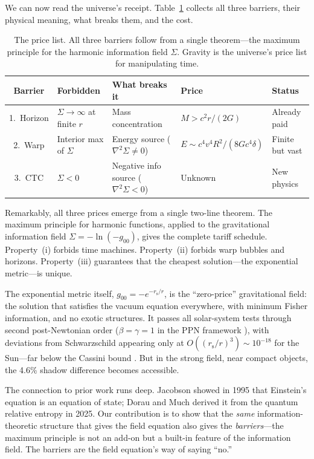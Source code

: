 \documentclass[12pt]{article}
\renewcommand{\baselinestretch}{2.0}
\newcommand{\rs}{r_{\mathrm{s}}}
\begin{document}
We can now read the universe's receipt. Table~\ref{tab:pricelist}
collects all three barriers, their physical meaning, what breaks them,
and the cost.

\begin{table}[h]
\renewcommand{\baselinestretch}{1.2}\selectfont
\centering
\begin{tabular}{@{}c p{2.2cm} p{2.4cm} p{3.2cm} l@{}}
\toprule
Barrier & Forbidden & What breaks it & Price & Status \\
\midrule
1.\ Horizon &
$\Sigma \to \infty$ at finite $r$ &
Mass concentration &
$M > c^2 r / (2G)$ &
Already paid \\[4pt]
2.\ Warp &
Interior max of $\Sigma$ &
Energy source ($\nabla^2\Sigma \neq 0$) &
$E \sim c^4 v^4 R^2 / (8Gc^4\delta)$ &
Finite but vast \\[4pt]
3.\ CTC &
$\Sigma < 0$ &
Negative info source ($\nabla^2\Sigma < 0$) &
Unknown &
New physics \\
\bottomrule
\end{tabular}
\caption{The price list. All three barriers follow from a single
theorem---the maximum principle for the harmonic information field
$\Sigma$. Gravity is the universe's price list for manipulating time.}
\label{tab:pricelist}
\end{table}

Remarkably, all three prices emerge from a single two-line theorem.
The maximum principle for harmonic functions, applied to the
gravitational information field $\Sigma = -\ln(-g_{00})$, gives the
complete tariff schedule. Property~(i) forbids time machines.
Property~(ii) forbids warp bubbles and horizons. Property~(iii)
guarantees that the cheapest solution---the exponential
metric---is unique.

The exponential metric itself, $g_{00} = -e^{-\rs/r}$, is the
``zero-price'' gravitational field: the solution that satisfies the
vacuum equation everywhere, with minimum Fisher information, and no
exotic structures. It passes all solar-system tests through second
post-Newtonian order ($\beta = \gamma = 1$ in the PPN framework
\cite{Will2014}), with deviations from Schwarzschild appearing only
at $O((\rs/r)^3) \sim 10^{-18}$ for the Sun---far below the Cassini
bound \cite{Bertotti2003}. But in the strong field, near compact
objects, the 4.6\% shadow difference becomes accessible.

The connection to prior work runs deep. Jacobson \cite{Jacobson1995}
showed in 1995 that Einstein's equation is an equation of state;
Dorau and Much \cite{DorauMuch2025} derived it from the quantum
relative entropy in 2025. Our contribution is to show that the
\emph{same} information-theoretic structure that gives the field
equation also gives the \emph{barriers}---the maximum principle is
not an add-on but a built-in feature of the information field.
The barriers are the field equation's way of saying ``no.''
\end{document}
